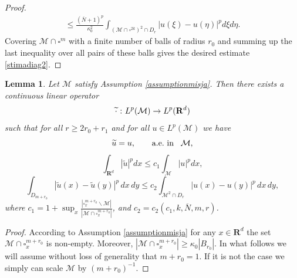 \documentclass[11pt]{article}
\newcommand{\ext}[1]{\widetilde{#1}}
\newcommand{\R}{\mathbf{R}}
\def\M{\mathcal{M}}
\newtheorem{lemma}[theorem]{Lemma}
\theoremstyle{remark}
\begin{document}
\begin{appendices}
\begin{proof}
\begin{align*}
		\le \frac{(\overline{N}+1)^{p} }{\kappa_0^2} \int_{(\M \cap \square^{2k})^2\cap D_r} |u(\xi)-u(\eta)|^p d\xi d\eta.
	\end{align*}
	Covering $\M \cap \square^m$ with a finite number of balls of radius $r_0$ and summing up the last inequality over all pairs of these balls gives the desired estimate \eqref{stimadiag2}.
\end{proof}
\begin{lemma}\label{lemma2.7}
Let $\M$ satisfy Assumption \ref{assumptionmisja}.
	Then there exists a continuous linear   operator
	$$
	\ext\cdot \hspace{0.02cm}:\hspace{0.02cm} L^p(\M)\rightarrow L^p(\R^d)
	$$
	such that for all $r\geq 2r_0+r_1$ and for all $u\in L^p(\M)$ we have
	\begin{equation}
		\label{Iestimate}
		\ext u=u,\qquad\mbox{a.e.~in} \hspace{0.3cm} \M,
	\end{equation}
	\begin{equation}
		\label{IIestimate}
		\int_{\R^d} |\ext u|^pdx\leq c_1\int_{\M} |u|^pdx,
	\end{equation}
	\begin{equation}
		\label{stimagrad}
		\int_{ D_{m+r_0}} |\ext u(x)-\ext u(y)|^p\,dx \,dy\leq c_2 \int_{\M^2\cap D_{r}}|u(x)-u(y)|^p\,dx \,dy,
	\end{equation}
	where $c_1=1+\sup_x\frac{|\square_x^{m+r_0} \backslash \M|}{|\M \cap \square_x^{m+r_0}|}$, and $c_2=c_2(c_1, k, \overline{N},m, r)$.
	
	
	
	 
\end{lemma}
\begin{proof}  
	
	According to Assumption \ref{assumptionmisja} for any $x\in \R^d$ the set  $\M\cap \square_x^{m+r_0}$ is non-empty. Moreover, $|\M\cap \square_x^{m+r_0}| \geq \kappa_0 |B_{r_0}|$. In what follows we will assume without loss of generality that $m+r_0 = 1$. If it is not the case we simply can scale $\M$ by $(m+r_0)^{-1}$. 
	

\end{proof}
\end{appendices}
\end{document}
